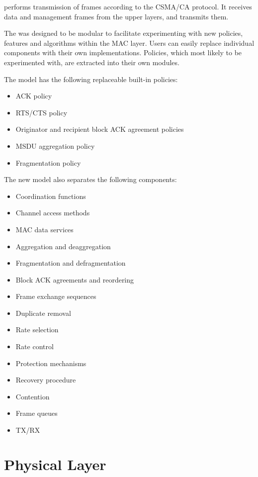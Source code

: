  performs transmission of frames according
to the CSMA/CA protocol. It receives data and management frames from
the upper layers, and transmits them.

The  was designed to be modular to facilitate experimenting
with new policies, features and algorithms within the MAC layer. Users can
easily replace individual components with their own implementations. Policies,
which most likely to be experimented with, are extracted into their own modules.

The model has the following replaceable built-in policies:

\begin{itemize}
  \item ACK policy
  \item RTS/CTS policy
  \item Originator and recipient block ACK agreement policies
  \item MSDU aggregation policy
  \item Fragmentation policy
\end{itemize}

The new model also separates the following components:

\begin{itemize}
  \item Coordination functions
  \item Channel access methods
  \item MAC data services
  \item Aggregation and deaggregation
  \item Fragmentation and defragmentation
  \item Block ACK agreements and reordering
  \item Frame exchange sequences
  \item Duplicate removal
  \item Rate selection
  \item Rate control
  \item Protection mechanisms
  \item Recovery procedure
  \item Contention
  \item Frame queues
  \item TX/RX
\end{itemize}

\section{Physical Layer}

